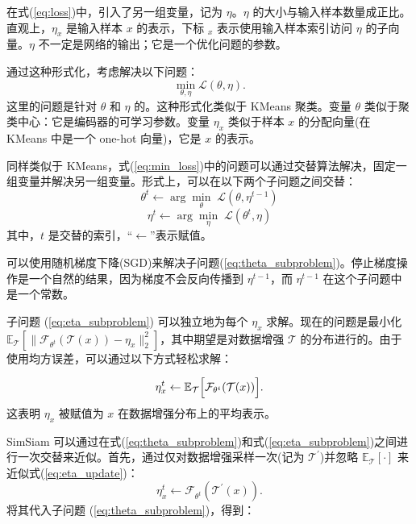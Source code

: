 \documentclass[master]{thesis-uestc}
\begin{document}
在式(\ref{eq:loss})中，引入了另一组变量，记为 $\eta$。$\eta$ 的大小与输入样本数量成正比。直观上，$\eta_{x}$ 是输入样本 $x$ 的表示，下标 ${}_{x}$ 表示使用输入样本索引访问 $\eta$ 的子向量。$\eta$ 不一定是网络的输出；它是一个优化问题的参数。

通过这种形式化，考虑解决以下问题：
\begin{equation}
\label{eq:min_loss}
\min_{\theta,\eta}\mathcal{L}(\theta,\eta).
\end{equation}
这里的问题是针对 $\theta$ 和 $\eta$ 的。这种形式化类似于 KMeans 聚类。变量 $\theta$ 类似于聚类中心：它是编码器的可学习参数。变量 $\eta_{x}$ 类似于样本 $x$ 的分配向量(在 KMeans 中是一个 one-hot 向量)，它是 $x$ 的表示。

同样类似于 KMeans，式(\ref{eq:min_loss})中的问题可以通过交替算法解决，固定一组变量并解决另一组变量。形式上，可以在以下两个子问题之间交替：
\begin{equation}
\label{eq:theta_subproblem}
\theta^{t} \leftarrow \arg\min_{\theta}\;\mathcal{L}(\theta,\eta^{t-1})
\end{equation}
\begin{equation}
\label{eq:eta_subproblem}
\eta^{t} \leftarrow \arg\min_{\eta}\;\mathcal{L}(\theta^{t},\eta)
\end{equation}
其中，$t$ 是交替的索引，“$\leftarrow$”表示赋值。

可以使用随机梯度下降(SGD)来解决子问题(\ref{eq:theta_subproblem})。停止梯度操作是一个自然的结果，因为梯度不会反向传播到 $\eta^{t-1}$，而 $\eta^{t-1}$ 在这个子问题中是一个常数。

子问题 (\ref{eq:eta_subproblem}) 可以独立地为每个 $\eta_{x}$ 求解。现在的问题是最小化$\mathbb{E}_{\mathcal{T}}\left[\|\mathcal{F}_{\theta^{t}}(\mathcal{T}(x))-\eta_{x} \|_{2}^{2}\right]$，其中期望是对数据增强 $\mathcal{T}$ 的分布进行的。由于使用均方误差，可以通过以下方式轻松求解：

\begin{equation}
\label{eq:eta_update}
\eta_{x}^{t}\leftarrow\mathbb{E}_{\mathcal{T}}\Big{[}\mathcal{F}_{\theta^{t}}( \mathcal{T}(x))\Big{]}.
\end{equation}
这表明 $\eta_{x}$ 被赋值为 $x$ 在数据增强分布上的平均表示。

SimSiam 可以通过在式(\ref{eq:theta_subproblem})和式(\ref{eq:eta_subproblem})之间进行一次交替来近似。首先，通过仅对数据增强采样一次(记为 $\mathcal{T}^{\prime}$)并忽略 $\mathbb{E}_{\mathcal{T}}[\cdot]$ 来近似式(\ref{eq:eta_update})：
\begin{equation}
\label{eq:eta_approx}
\eta_{x}^{t}\leftarrow\mathcal{F}_{\theta^{t}}(\mathcal{T}^{\prime}(x)).
\end{equation}
将其代入子问题 (\ref{eq:theta_subproblem})，得到：
\end{document}
